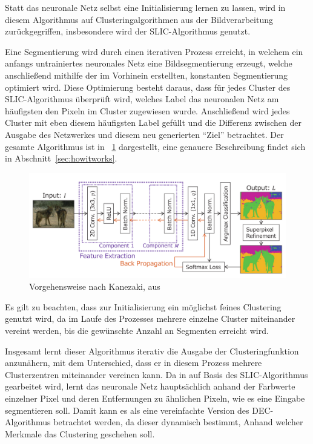 Statt das neuronale Netz selbst eine Initialisierung lernen zu lassen, wird in diesem Algorithmus auf Clusteringalgorithmen aus der Bildverarbeitung zurückgegriffen, insbesondere wird der SLIC-Algorithmus \cite{achanta_10} genutzt.

Eine Segmentierung wird durch einen iterativen Prozess erreicht, in welchem ein anfangs untrainiertes neuronales Netz eine Bildsegmentierung erzeugt, welche anschließend mithilfe der im Vorhinein erstellten, konstanten Segmentierung optimiert wird. Diese Optimierung besteht daraus, dass für jedes Cluster des SLIC-Algorithmus überprüft wird, welches Label das neuronalen Netz am häufigsten den Pixeln im Cluster zugewiesen wurde. Anschließend wird jedes Cluster mit eben diesem häufigsten Label gefüllt und die Differenz zwischen der Ausgabe des Netzwerkes und diesem neu generierten \enquote{Ziel} betrachtet.
Der gesamte Algorithmus ist in \figurename~\ref{fig:Kan18_01} dargestellt, eine genauere Beschreibung findet sich in Abschnitt~\ref{sec:howitworks}.

\begin{figure}[h!]
	\centering
	\includegraphics[width=.8\textwidth,keepaspectratio]{images/Kan18/Kan18_01.png}
	\caption{Vorgehensweise nach Kanezaki, aus \cite{kanezaki_18}}
	\label{fig:Kan18_01}
\end{figure}

Es gilt zu beachten, dass zur Initialisierung ein möglichst feines Clustering genutzt wird, da im Laufe des Prozesses mehrere einzelne Cluster miteinander vereint werden, bis die gewünschte Anzahl an Segmenten erreicht wird.

Insgesamt lernt dieser Algorithmus iterativ die Ausgabe der Clusteringfunktion anzunähern, mit dem Unterschied, dass er in diesem Prozess mehrere Clusterzentren miteinander vereinen kann. Da in \cite{kanezaki_18} auf Basis des SLIC-Algorithmus gearbeitet wird, lernt das neuronale Netz hauptsächlich anhand der Farbwerte einzelner Pixel und deren Entfernungen zu ähnlichen Pixeln, wie es eine Eingabe segmentieren soll. Damit kann es als eine vereinfachte Version des DEC-Algorithmus betrachtet werden, da dieser dynamisch bestimmt, Anhand welcher Merkmale das Clustering geschehen soll.

